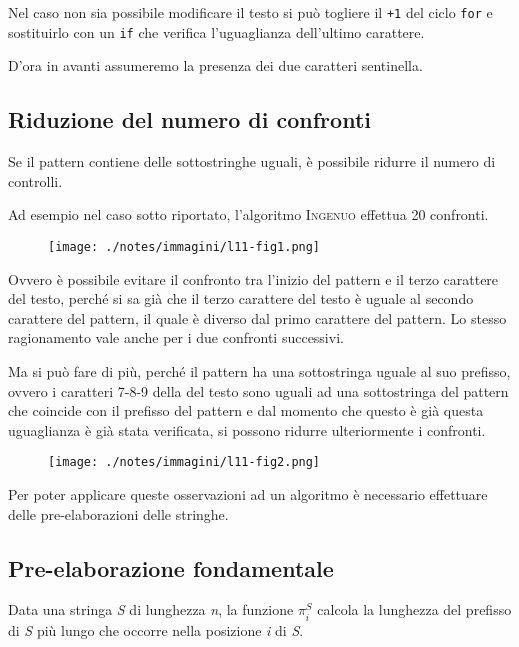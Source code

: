 Nel caso non sia possibile modificare il testo si può togliere il
\texttt{+1} del ciclo \texttt{for} e sostituirlo con un \texttt{if} che
verifica l'uguaglianza dell'ultimo carattere.

D'ora in avanti assumeremo la presenza dei due caratteri sentinella.

\subsection{Riduzione del numero di confronti}\label{riduzione-del-numero-di-confronti}

Se il pattern contiene delle sottostringhe uguali, è possibile ridurre
il numero di controlli.

Ad esempio nel caso sotto riportato, l'algoritmo \textsc{Ingenuo}
effettua 20 confronti.

\begin{figure}[htbp]
\centering
\texttt{[image: ./notes/immagini/l11-fig1.png]}
\end{figure}

Ovvero è possibile evitare il confronto tra l'inizio del pattern e il
terzo carattere del testo, perché si sa già che il terzo carattere del
testo è uguale al secondo carattere del pattern, il quale è diverso dal
primo carattere del pattern. Lo stesso ragionamento vale anche per i due
confronti successivi.

Ma si può fare di più, perché il pattern ha una sottostringa uguale al
suo prefisso, ovvero i caratteri 7-8-9 della del testo sono uguali ad
una sottostringa del pattern che coincide con il prefisso del pattern e
dal momento che questo è già questa uguaglianza è già stata verificata,
si possono ridurre ulteriormente i confronti.

\begin{figure}[htbp]
\centering
\texttt{[image: ./notes/immagini/l11-fig2.png]}
\end{figure}

Per poter applicare queste osservazioni ad un algoritmo è necessario
effettuare delle pre-elaborazioni delle stringhe.

\subsection{Pre-elaborazione fondamentale}\label{pre-elaborazione-fondamentale}

Data una stringa \emph{S} di lunghezza \emph{n}, la funzione
$\pi_i^S$ calcola la lunghezza del prefisso di \emph{S} più lungo
che occorre nella posizione \emph{i} di \emph{S}.


